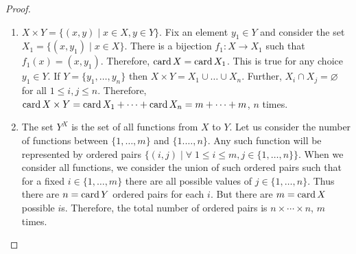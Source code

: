 \begin{proof}
\begin{enumerate}
\item $X \times Y = \{(x, y) \;|\; x \in X, y \in Y\}$. Fix an element 
$y_1 \in Y$ and consider the set $X_1 = \{(x, y_1) \;|\; x \in X\}$. There 
is a bijection $f_1: X \rightarrow X_1$ such that $f_1(x) = (x, y_1)$.
Therefore, $\operatorname{card} X = \operatorname{card} X_1$. This is true for any choice $y_1 \in Y$.
If $Y = \{y_1, \ldots, y_n\}$ then $X \times Y = X_1 \cup \ldots \cup X_n$.
Further, $X_i \cap X_j = \varnothing$ for all $1 \le i, j \le n$. 
Therefore, $\operatorname{card} X \times Y = \operatorname{card} X_1 + \cdots + \operatorname{card} X_n = m + \cdots
+ m$, $n$ times. 

\item The set $Y^X$ is the set of all functions from $X$ to $Y$. Let us 
consider the number of functions between $\{1, \ldots, m\}$ and $\{1. 
\ldots, n\}$. Any such function will be represented by ordered pairs 
$\{(i, j) \;|\; \forall\; 1 \le i \le m, j \in \{1, \ldots, n\}\}$. When
we consider all functions, we consider the union of such ordered pairs 
such that for a fixed $i \in \{1, \ldots, m\}$ there are all possible
values of $j \in \{1, \ldots, n\}$. Thus there are $n = \operatorname{card} Y$ ordered
pairs for each $i$. But there are $m = \operatorname{card} X$ possible $i$s. Therefore,
the total number of ordered pairs is $n \times \cdots \times n$, $m$
times.
\end{enumerate}
\end{proof}


